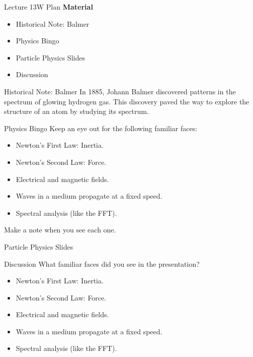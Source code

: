 \documentclass[english]{beamer}
\begin{document}
\begin{frame}{Lecture 13W Plan}
  \textbf{Material}
  \begin{itemize}
    \item Historical Note: Balmer
    \item Physics Bingo
    \item Particle Physics Slides
    \item Discussion
  \end{itemize}
\end{frame}

\begin{frame}{Historical Note: Balmer}
  In 1885, Johann Balmer discovered patterns in the spectrum of glowing hydrogen gas. This discovery paved the way to explore the structure of an atom by studying its spectrum.
\end{frame}

\begin{frame}{Physics Bingo}
  Keep an eye out for the following familiar faces:\\
  \begin{itemize}
    \item Newton's First Law: Inertia.
    \item Newton's Second Law: Force.
    \item Electrical and magnetic fields.
    \item Waves in a medium propagate at a fixed speed.
    \item Spectral analysis (like the FFT).
  \end{itemize}
  Make a note when you see each one.
\end{frame}

\begin{frame}{Particle Physics Slides}
  
\end{frame}

\begin{frame}{Discussion}
  What familiar faces did you see in the presentation?\\
  \begin{itemize}
    \item Newton's First Law: Inertia.
    \item Newton's Second Law: Force.
    \item Electrical and magnetic fields.
    \item Waves in a medium propagate at a fixed speed.
    \item Spectral analysis (like the FFT).
  \end{itemize}
\end{frame}
\end{document}
